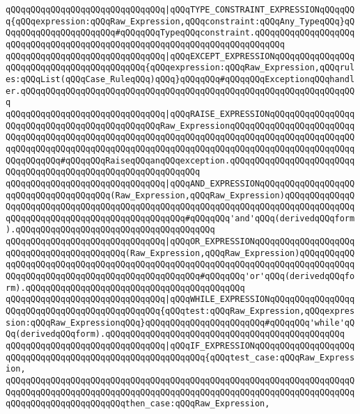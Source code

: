 \verb|qQQqqQQqqQQqqQQqqQQqqQQqqQQqqQQq|\verb#|qQQqTYPE_CONSTRAINT_EXPRESSIONqQQqqQQq{qQQqexpression:qQQqRaw_Expression,qQQqconstraint:qQQqAny_TypeqQQq}qQQqqQQqqQQqqQQqqQQqqQQq#\verb|#qQQqqQQqTypeqQQqconstraint.qQQqqQQqqQQqqQQqqQQqqQQqqQQqqQQqqQQqqQQqqQQqqQQqqQQqqQQqqQQqqQQqqQQqqQQqqQQq|\newline
\verb|qQQqqQQqqQQqqQQqqQQqqQQqqQQqqQQq|\verb#|qQQqEXCEPT_EXPRESSIONqQQqqQQqqQQqqQQqqQQqqQQqqQQqqQQqqQQqqQQqqQQq{qQQqexpression:qQQqRaw_Expression,qQQqrules:qQQqList(qQQqCase_RuleqQQq)qQQq}qQQqqQQq#\verb|#qQQqqQQqExceptionqQQqhandler.qQQqqQQqqQQqqQQqqQQqqQQqqQQqqQQqqQQqqQQqqQQqqQQqqQQqqQQqqQQqqQQqqQQq|\newline
\verb|qQQqqQQqqQQqqQQqqQQqqQQqqQQqqQQq|\verb#|qQQqRAISE_EXPRESSIONqQQqqQQqqQQqqQQqqQQqqQQqqQQqqQQqqQQqqQQqqQQqqQQqRaw_ExpressionqQQqqQQqqQQqqQQqqQQqqQQqqQQqqQQqqQQqqQQqqQQqqQQqqQQqqQQqqQQqqQQqqQQqqQQqqQQqqQQqqQQqqQQqqQQqqQQqqQQqqQQqqQQqqQQqqQQqqQQqqQQqqQQqqQQqqQQqqQQqqQQqqQQqqQQqqQQqqQQqqQQqqQQqqQQqqQQq#\verb|#qQQqqQQqRaiseqQQqanqQQqexception.qQQqqQQqqQQqqQQqqQQqqQQqqQQqqQQqqQQqqQQqqQQqqQQqqQQqqQQqqQQqqQQq|\newline
\verb|qQQqqQQqqQQqqQQqqQQqqQQqqQQqqQQq|\verb#|qQQqAND_EXPRESSIONqQQqqQQqqQQqqQQqqQQqqQQqqQQqqQQqqQQqqQQq(Raw_Expression,qQQqRaw_Expression)qQQqqQQqqQQqqQQqqQQqqQQqqQQqqQQqqQQqqQQqqQQqqQQqqQQqqQQqqQQqqQQqqQQqqQQqqQQqqQQqqQQqqQQqqQQqqQQqqQQqqQQqqQQqqQQqqQQqqQQq#\verb|#qQQqqQQq'and'qQQq(derivedqQQqform).qQQqqQQqqQQqqQQqqQQqqQQqqQQqqQQqqQQqqQQq|\newline
\verb|qQQqqQQqqQQqqQQqqQQqqQQqqQQqqQQq|\verb#|qQQqOR_EXPRESSIONqQQqqQQqqQQqqQQqqQQqqQQqqQQqqQQqqQQqqQQqqQQq(Raw_Expression,qQQqRaw_Expression)qQQqqQQqqQQqqQQqqQQqqQQqqQQqqQQqqQQqqQQqqQQqqQQqqQQqqQQqqQQqqQQqqQQqqQQqqQQqqQQqqQQqqQQqqQQqqQQqqQQqqQQqqQQqqQQqqQQqqQQq#\verb|#qQQqqQQq'or'qQQq(derivedqQQqform).qQQqqQQqqQQqqQQqqQQqqQQqqQQqqQQqqQQqqQQqqQQq|\newline
\verb|qQQqqQQqqQQqqQQqqQQqqQQqqQQqqQQq|\verb#|qQQqWHILE_EXPRESSIONqQQqqQQqqQQqqQQqqQQqqQQqqQQqqQQqqQQqqQQqqQQqqQQq{qQQqtest:qQQqRaw_Expression,qQQqexpression:qQQqRaw_ExpressionqQQq}qQQqqQQqqQQqqQQqqQQqqQQq#\verb|#qQQqqQQq'while'qQQq(derivedqQQqform).qQQqqQQqqQQqqQQqqQQqqQQqqQQqqQQqqQQqqQQqqQQqqQQq|\newline
\verb|qQQqqQQqqQQqqQQqqQQqqQQqqQQqqQQq|\verb#|qQQqIF_EXPRESSIONqQQqqQQqqQQqqQQqqQQqqQQqqQQqqQQqqQQqqQQqqQQqqQQqqQQqqQQqqQQq{qQQqtest_case:qQQqRaw_Expression,#\newline
\verb|qQQqqQQqqQQqqQQqqQQqqQQqqQQqqQQqqQQqqQQqqQQqqQQqqQQqqQQqqQQqqQQqqQQqqQQqqQQqqQQqqQQqqQQqqQQqqQQqqQQqqQQqqQQqqQQqqQQqqQQqqQQqqQQqqQQqqQQqqQQqqQQqqQQqqQQqqQQqqQQqqQQqthen_case:qQQqRaw_Expression,|\newline
